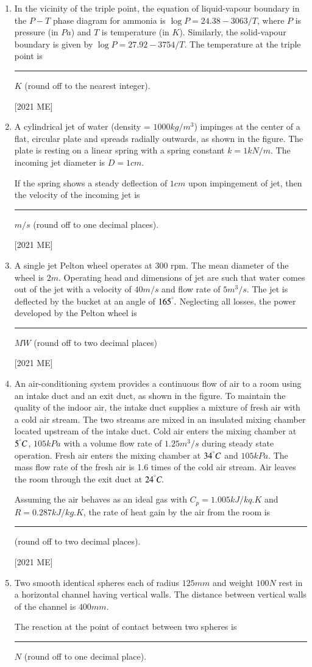 \documentclass[journal]{IEEEtran}
\begin{document}
\begin{enumerate}
\hfill [2021 ME] 
\item In the vicinity of the triple point, the equation of liquid-vapour boundary
in the $P - T$ phase diagram for ammonia is $\log P = 24.38 - 3063/T$,
where $P$ is pressure (in $Pa$) and $T$ is temperature (in $K$). Similarly, the
solid-vapour boundary is given by $\log P = 27.92 - 3754/T$. The
temperature at the triple point is \rule{2cm}{0.4pt}$K$ (round off to the nearest integer).

\hfill [2021 ME]
\item A cylindrical jet of water (density = $1000 kg/m^3$) impinges at the center of a
flat, circular plate and spreads radially outwards, as shown in the figure.
The plate is resting on a linear spring with a spring constant $k = 1 kN/m.$
The incoming jet diameter is $D = 1 cm.$

If the spring shows a steady deflection of $1 cm$ upon impingement of jet,
then the velocity of the incoming jet is \rule{2cm}{0.4pt}$m/s$ (round off to one decimal places).

\hfill [2021 ME]
\item A single jet Pelton wheel operates at 300 rpm. The mean diameter of the
wheel is $2 m$. Operating head and dimensions of jet are such that water
comes out of the jet with a velocity of $40 m/s$ and flow rate of $5 m^3
/s$. The jet
is deflected by the bucket at an angle of $165^\degree.$ Neglecting all losses, the
power developed by the Pelton wheel is \rule{2cm}{0.4pt} $MW$ (round off to two decimal places)

\hfill [2021 ME]
\item An air-conditioning system provides a continuous flow of air to a room using
an intake duct and an exit duct, as shown in the figure. To maintain the
quality of the indoor air, the intake duct supplies a mixture of fresh air with
a cold air stream. The two streams are mixed in an insulated mixing chamber
located upstream of the intake duct. Cold air enters the mixing chamber at
$5 ^\degree C$, $105 kPa$ with a volume flow rate of $1.25 m^3/s$ during steady state
operation. Fresh air enters the mixing chamber at $34 ^\degree C$ and $105 kPa$. The
mass flow rate of the fresh air is 1.6 times of the cold air stream. Air leaves
the room through the exit duct at $24 ^\degree C.$

Assuming the air behaves as an ideal gas with $C_p = 1.005 kJ/kq.K$ and $R = 0.287 kJ/kg.K$, the rate of heat gain by the air from the room is \rule{2cm}{0.4pt} (round off to two decimal places).

\hfill [2021 ME]
\item Two smooth identical spheres each of radius $125 mm$ and weight $100 N$ rest
in a horizontal channel having vertical walls. The distance between vertical
walls of the channel is $400 mm.$ 

The reaction at the point of contact between two spheres is \rule{2cm}{0.4pt} $N$ (round off to one decimal place).


\end{enumerate}
\end{document}
